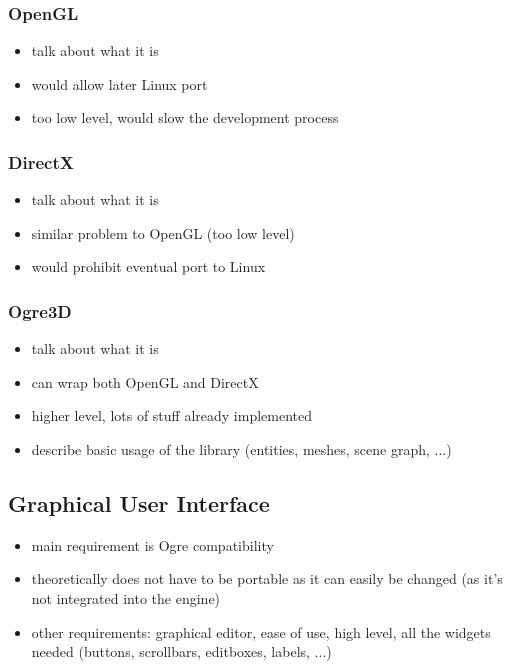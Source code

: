 \subsubsection{OpenGL}

\begin{itemize}
    \item talk about what it is
    \item would allow later Linux port
    \item too low level, would slow the development process
\end{itemize}

\subsubsection{DirectX}

\begin{itemize}
    \item talk about what it is
    \item similar problem to OpenGL (too low level)
    \item would prohibit eventual port to Linux
\end{itemize}

\subsubsection{Ogre3D}

\begin{itemize}
    \item talk about what it is
    \item can wrap both OpenGL and DirectX
    \item higher level, lots of stuff already implemented
    \item describe basic usage of the library (entities, meshes, scene graph, ...) 
\end{itemize}

\subsection{Graphical User Interface}

\begin{itemize}
    \item main requirement is Ogre compatibility
    \item theoretically does not have to be portable as it can easily be changed
        (as it's not integrated into the engine)
    \item other requirements: graphical editor, ease of use, high level, all the
        widgets needed (buttons, scrollbars, editboxes, labels, ...)

\end{itemize}

